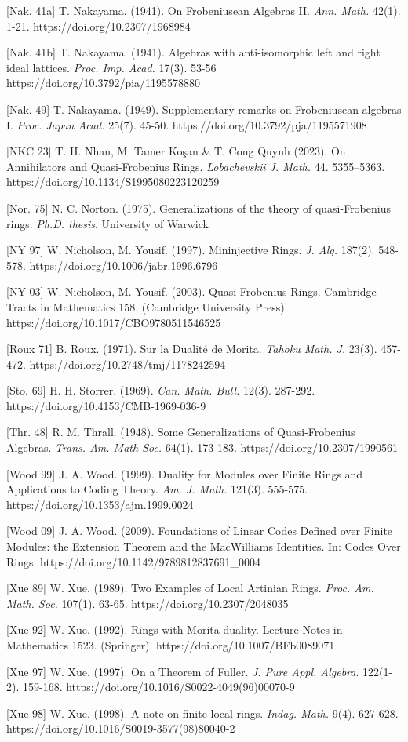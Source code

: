 \documentclass[11pt]{article}
\theoremstyle{plain}
\theoremstyle{remark}
\theoremstyle{plain}
\begin{document}
[Nak. 41a]  T. Nakayama. (1941). On Frobeniusean Algebras II. \textit{Ann. Math.} 42(1). 1-21. https://doi.org/10.2307/1968984

[Nak. 41b] T. Nakayama. (1941). 
Algebras with anti-isomorphic left and right ideal lattices. \textit{Proc. Imp. Acad.} 17(3). 53-56  https://doi.org/10.3792/pia/1195578880

[Nak. 49] T. Nakayama. (1949). Supplementary remarks on Frobeniusean algebras I. \textit{Proc. Japan Acad.} 25(7). 45-50. https://doi.org/10.3792/pja/1195571908

[NKC 23] T. H. Nhan,  M.  Tamer Koşan \&  T. Cong Quynh (2023). On Annihilators and Quasi-Frobenius Rings. \textit{Lobachevskii J. Math.} 44. 5355–5363. https://doi.org/10.1134/S1995080223120259

[Nor. 75] N. C. Norton. (1975). Generalizations of the theory of quasi-Frobenius rings.  \textit{Ph.D. thesis}. University of Warwick

[NY 97] W. Nicholson, M. Yousif. (1997). Mininjective Rings. \textit{J. Alg.} 187(2). 548-578. https://doi.org/10.1006/jabr.1996.6796


[NY 03] W. Nicholson, M. Yousif. (2003). Quasi-Frobenius Rings. 
Cambridge Tracts in Mathematics 158. (Cambridge University Press).
https://doi.org/10.1017/CBO9780511546525

[Roux 71] B. Roux. (1971). Sur la Dualité de Morita. \textit{Tahoku Math. J.} 23(3). 457-472. https://doi.org/10.2748/tmj/1178242594


[Sto. 69] H. H. Storrer. (1969). \textit{Can. Math. Bull.} 12(3). 287-292.  https://doi.org/10.4153/CMB-1969-036-9

[Thr. 48] R. M. Thrall. (1948). Some Generalizations of Quasi-Frobenius Algebras. \textit{Trans. Am. Math Soc.} 64(1). 173-183. https://doi.org/10.2307/1990561

[Wood 99] J. A. Wood. (1999). Duality for Modules over Finite Rings and Applications to Coding Theory. \textit{ Am. J. Math.} 121(3). 555-575. https://doi.org/10.1353/ajm.1999.0024

[Wood 09]  J. A. Wood. (2009). Foundations of Linear Codes Defined over Finite Modules: the Extension Theorem and the MacWilliams Identities. In: Codes Over Rings. https://doi.org/10.1142/9789812837691\_0004

[Xue 89] W. Xue. (1989). Two Examples of Local Artinian Rings. \textit{Proc. Am. Math. Soc.} 107(1). 63-65. https://doi.org/10.2307/2048035

[Xue 92] W. Xue. (1992). Rings with Morita duality. Lecture Notes in Mathematics 1523. (Springer). https://doi.org/10.1007/BFb0089071

[Xue 97]  W. Xue. (1997). On a Theorem of Fuller. \textit{J. Pure Appl. Algebra}. 122(1-2). 159-168. https://doi.org/10.1016/S0022-4049(96)00070-9


[Xue 98] W. Xue. (1998). A note on finite local rings. \textit{Indag. Math.} 9(4). 627-628. https://doi.org/10.1016/S0019-3577(98)80040-2
\end{document}
